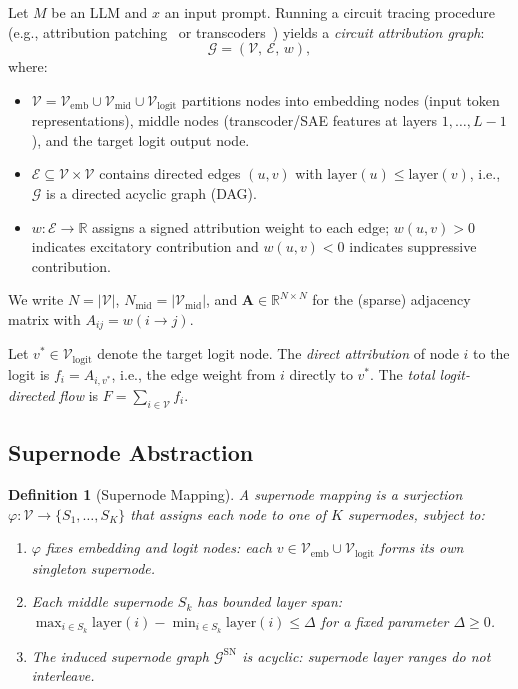 \documentclass[11pt]{article}
\newtheorem{definition}[theorem]{Definition}
\newcommand{\cG}{\mathcal{G}}
\newcommand{\cV}{\mathcal{V}}
\newcommand{\cE}{\mathcal{E}}
\newcommand{\bA}{\mathbf{A}}
\newcommand{\R}{\mathbb{R}}
\newcommand{\1}{\mathbbm{1}}
\begin{document}
Let $M$ be an LLM and $x$ an input prompt.
Running a circuit tracing procedure (e.g., attribution patching~\citep{meng2022locating} or transcoders~\citep{templeton2024scaling}) yields a \emph{circuit attribution graph}:
\[
  \cG = (\cV,\, \cE,\, w),
\]
where:
\begin{itemize}[leftmargin=2em]
  \item $\cV = \cV_{\mathrm{emb}} \cup \cV_{\mathrm{mid}} \cup \cV_{\mathrm{logit}}$ partitions nodes into embedding nodes (input token representations), middle nodes (transcoder/SAE features at layers $1,\ldots,L-1$), and the target logit output node.
  \item $\cE \subseteq \cV \times \cV$ contains directed edges $(u,v)$ with $\mathrm{layer}(u) \le \mathrm{layer}(v)$, i.e., $\cG$ is a directed acyclic graph (DAG).
  \item $w: \cE \to \R$ assigns a signed attribution weight to each edge; $w(u,v) > 0$ indicates excitatory contribution and $w(u,v) < 0$ indicates suppressive contribution.
\end{itemize}

We write $N = |\cV|$, $N_{\mathrm{mid}} = |\cV_{\mathrm{mid}}|$, and $\bA \in \R^{N \times N}$ for the (sparse) adjacency matrix with $A_{ij} = w(i \to j)$.

Let $v^* \in \cV_{\mathrm{logit}}$ denote the target logit node.
The \emph{direct attribution} of node $i$ to the logit is $f_i = A_{i,v^*}$, i.e., the edge weight from $i$ directly to $v^*$.
The \emph{total logit-directed flow} is $F = \sum_{i \in \cV} f_i$.

\subsection{Supernode Abstraction}
\label{sec:sn-def}

\begin{definition}[Supernode Mapping]
  A \emph{supernode mapping} is a surjection $\varphi: \cV \to \{S_1, \ldots, S_K\}$ that assigns each node to one of $K$ supernodes, subject to:
  \begin{enumerate}[label=(\roman*)]
    \item $\varphi$ fixes embedding and logit nodes: each $v \in \cV_{\mathrm{emb}} \cup \cV_{\mathrm{logit}}$ forms its own singleton supernode.
    \item Each middle supernode $S_k$ has bounded layer span: $\max_{i \in S_k} \mathrm{layer}(i) - \min_{i \in S_k} \mathrm{layer}(i) \le \Delta$ for a fixed parameter $\Delta \ge 0$.
    \item The induced supernode graph $\cG^{\mathrm{SN}}$ is acyclic: supernode layer ranges do not interleave.
  \end{enumerate}
\end{definition}
\end{document}
